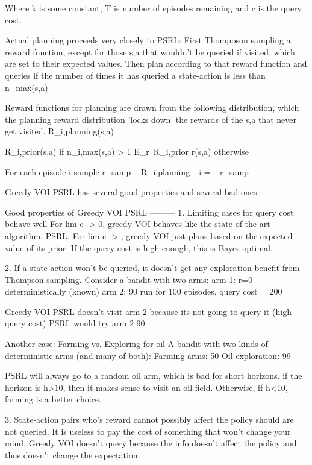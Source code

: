 Where k is some constant, T is number of episodes remaining and c is the query cost.

Actual planning proceeds very closely to PSRL: 
First Thomposon sampling a reward function, except for those s,a that wouldn't be queried if visited, which are set to their expected values. 
Then plan according to that reward function and queries if the number of times it has queried a state-action is less than n_max(s,a)

Reward functions for planning are drawn from the following distribution, which the planning reward distribution 'locks down' the rewards of the s,a that never get visited.
R_i,planning(s,a) ~ { R_i,prior(s,a)        if n_i,max(s,a) > 1
                      E_r~R_i,prior r(s,a)  otherwise

For each episode i 
  sample r_samp ~ R_i,planning  
  \pi_i = \pi_{r_samp}


Greedy VOI PSRL has several good properties and several bad ones.

Good properties of Greedy VOI PSRL
---------
1. Limiting cases for query cost behave well 
  For lim c -> 0, greedy VOI behaves like the state of the art algorithm, PSRL.
  For lim c -> \inf, greedy VOI just plans based on the expected value of its prior. If the query cost is high enough, this is Bayes optimal.

2. If a state-action won't be queried, it doesn't get any exploration benefit from Thompson sampling.
  Consider a bandit with two arms: 
    arm 1: r=0 deterministically (known) 
    arm 2: 90%
  run for 100 episodes, query cost = 200

  Greedy VOI PSRL doesn't visit arm 2 because its not going to query it (high query cost)
  PSRL would try arm 2 90%

  Another case: Farming vs. Exploring for oil
    A bandit with two kinds of deterministic arms (and many of both): 
      Farming arms: 50%
      Oil exploration: 99%

    PSRL will always go to a random oil arm, which is bad for short horizons. if the horizon is h>10, then it makes sense to visit an oil field. Otherwise, if h<10, farming is a better choice.
    

3. State-action pairs who's reward cannot possibly affect the policy should are not queried. It is useless to pay the cost of something that won't change your mind.
  Greedy VOI doesn't query because the info doesn't affect the policy and thus doesn't change the expectation.

}
